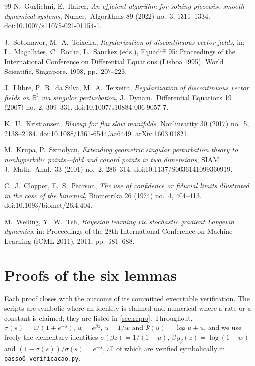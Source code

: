 \documentclass[11pt]{article}
\theoremstyle{definition}
\theoremstyle{remark}
\begin{document}
\begin{thebibliography}{99}
 N.~Guglielmi, E.~Hairer, \emph{An efficient algorithm for solving
piecewise-smooth dynamical systems}, Numer.\ Algorithms 89 (2022) no.~3,
1311--1334. doi:10.1007/s11075-021-01154-1.

 J.~Sotomayor, M.~A.~Teixeira, \emph{Regularization of
discontinuous vector fields}, in: L.~Magalh\~aes, C.~Rocha, L.~Sanchez (eds.),
Equadiff 95: Proceedings of the International Conference on Differential
Equations (Lisboa 1995), World Scientific, Singapore, 1998, pp.~207--223.

 J.~Llibre, P.~R.~da Silva, M.~A.~Teixeira, \emph{Regularization
of discontinuous vector fields on $\mathbb{R}^3$ via singular perturbation},
J.~Dynam.\ Differential Equations 19 (2007) no.~2, 309--331.
doi:10.1007/s10884-006-9057-7.

 K.~U.~Kristiansen, \emph{Blowup for flat slow manifolds},
Nonlinearity 30 (2017) no.~5, 2138--2184. doi:10.1088/1361-6544/aa6449.
arXiv:1603.01821.

 M.~Krupa, P.~Szmolyan, \emph{Extending geometric singular
perturbation theory to nonhyperbolic points---fold and canard points in two
dimensions}, SIAM J.~Math.\ Anal.\ 33 (2001) no.~2, 286--314.
doi:10.1137/S0036141099360919.

 C.~J.~Clopper, E.~S.~Pearson, \emph{The use of confidence or
fiducial limits illustrated in the case of the binomial}, Biometrika 26 (1934)
no.~4, 404--413. doi:10.1093/biomet/26.4.404.

 M.~Welling, Y.~W.~Teh, \emph{Bayesian learning via stochastic
gradient Langevin dynamics}, in: Proceedings of the 28th International Conference
on Machine Learning (ICML 2011), 2011, pp.~681--688.

\end{thebibliography}

\appendix
\section{Proofs of the six lemmas}\label{app:lemmas}

Each proof closes with the outcome of its committed executable verification. The
scripts are symbolic where an identity is claimed and numerical where a rate or a
constant is claimed; they are listed in \cref{sec:repro}. Throughout,
$\sigma(s)=1/(1+e^{-s})$, $w=e^{\beta z}$, $u=1/w$ and $\Psi(u)=\log u+u$, and we
use freely the elementary identities $\sigma(\beta z)=1/(1+u)$,
$\beta\,g_\beta(z)=\log(1+w)$ and $(1-\sigma(s))/\sigma(s)=e^{-s}$, all of which
are verified symbolically in \texttt{passo0\_verificacao.py}.
\end{document}
